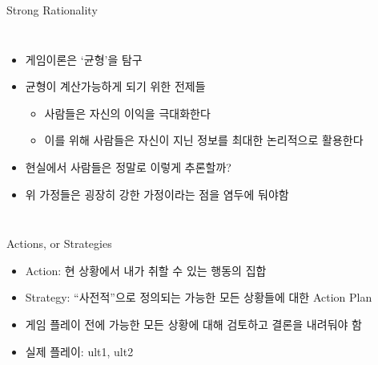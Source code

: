 \documentclass[final]{beamer}
\begin{document}
\begin{frame}[t]{Strong Rationality}
	\begin{columns}[c]
		\begin{itemize}
			\item 게임이론은 `균형'을 탐구
			\item 균형이 계산가능하게 되기 위한 전제들
			\begin{itemize}
				\item 사람들은 자신의 이익을 극대화한다
				\item 이를 위해 사람들은 자신이 지닌 정보를 최대한 논리적으로 활용한다
			\end{itemize}
			\item 현실에서 사람들은 정말로 이렇게 추론할까?
			\item 위 가정들은 굉장히 강한 가정이라는 점을 염두에 둬야함
		\end{itemize}
	\end{columns}
\end{frame}

\begin{frame}[t]{Actions, or Strategies}
	\begin{itemize}
		\item Action: 현 상황에서 내가 취할 수 있는 행동의 집합
		\item Strategy: ``사전적''으로 정의되는 가능한 모든 상황들에 대한 Action Plan
		\item 게임 플레이 전에 가능한 모든 상황에 대해 검토하고 결론을 내려둬야 함
		\item 실제 플레이: ult1, ult2
	\end{itemize}
\end{frame}
\end{document}
